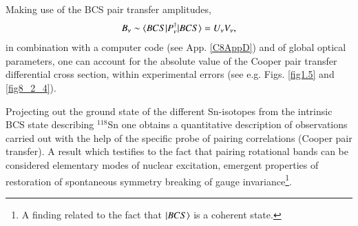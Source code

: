  Making use of the BCS pair transfer amplitudes, 
\begin{align}\label{eq0.1.104}
B_\nu\sim\langle {BCS|P^\dagger_\nu|BCS} \rangle=U_\nu V_\nu,
\end{align}
in combination with a computer code (see App. \ref{C8AppD}) and of global optical parameters, one can account for the  absolute value of the Cooper pair transfer differential cross section, within experimental errors (see e.g. Figs. \ref{fig1.5} and   \ref{fig8_2_4}). 


Projecting out the ground state of the   different Sn-isotopes from the intrinsic BCS state describing $^{118}$Sn one obtains a quantitative description of observations carried out with the help of the specific probe of pairing correlations (Cooper pair transfer). A result which testifies to the fact that pairing rotational bands can be considered elementary modes of nuclear excitation, emergent properties of restoration of spontaneous symmetry breaking of  gauge invariance\footnote{A finding related to the fact that $|{BCS} \rangle$ is a coherent state.}. 


